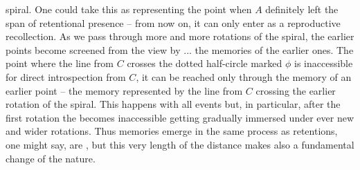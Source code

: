 spiral. One could take this as representing the point when $A$ definitely left
the span of retentional presence -- from now on, it can only enter  as a
reproductive recollection. As we pass through more and more rotations of the spiral, the
earlier points become screened from the view by ...  the memories of the earlier
ones. The point where the line from $C$ crosses the dotted half-circle marked
$\phi$ is inaccessible for direct introspection from $C$, it can be reached only
through the memory of an earlier point -- the memory represented by the line
from $C$ crossing the earlier rotation of the spiral.  This happens with all
events but, in particular, after the first rotation the  becomes
inaccessible getting gradually immersed under ever new and wider rotations. Thus
memories emerge in the same process as retentions, one might say, are , but this very length of the distance makes also a
fundamental change of the nature.

